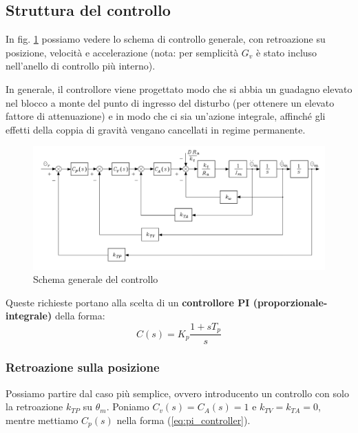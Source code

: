 \vspace{25pt}
\subsection{Struttura del controllo}

In fig. \ref{fig:decentralizedjointspacecontrol6} possiamo vedere lo schema di controllo generale, con retroazione su posizione, velocità e accelerazione (nota: per semplicità $G_v$ è stato incluso nell'anello di controllo più interno).

In generale, il controllore viene progettato modo che si abbia un guadagno elevato nel blocco a monte del punto di ingresso del disturbo (per ottenere un elevato fattore di attenuazione) e in modo che ci sia un’azione integrale, affinché gli effetti della coppia di gravità vengano cancellati in regime permanente.

\begin{figure}[H]
	\centering
	\includegraphics[width=0.9\linewidth]{images/decentralized_joint_space_control_6}
	\caption{Schema generale del controllo}
	\label{fig:decentralizedjointspacecontrol6}
\end{figure}


Queste richieste portano alla scelta di un \textbf{controllore PI (proporzionale-integrale)} della forma:
\begin{equation}\label{eq:pi_controller}
C(s) = K_p \frac{1+sT_p}{s}
\end{equation}





\vspace*{10pt}
\subsubsection{Retroazione sulla posizione}
Possiamo partire dal caso più semplice, ovvero introducento un controllo con solo la retroazione $k_{TP}$ su $\theta_m$. Poniamo $C_v(s) = C_A(s) = 1$ e $k_{TV} = k_{TA} = 0$, mentre mettiamo $C_p(s)$ nella forma (\ref{eq:pi_controller}).

